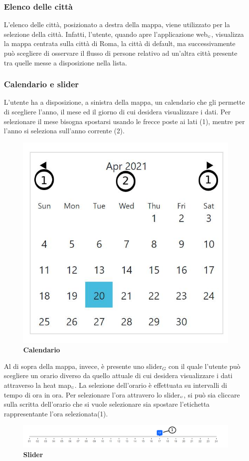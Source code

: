 \subsubsection{Elenco delle città} \label{UtilizzoDiGDPGatheringDetecionPlatformContenutoCentralePaginaInizialeHomeMenùATendina}
L'elenco delle città, posizionato a destra della mappa, viene utilizzato per la selezione della città. Infatti, l'utente, quando apre l'applicazione web$_{\scaleto{G}{3pt}}$, visualizza la mappa centrata sulla città di Roma, la città di default, ma successivamente può scegliere di osservare il flusso di persone relativo ad un'altra città presente tra quelle messe a disposizione nella lista.


\subsubsection{Calendario e slider}\label{UtilizzoDiGDPGatheringDetecionPlatformContenutoCentralePaginaInizialeHomeCalendarioESlider}
L'utente ha a disposizione, a sinistra della mappa, un calendario che gli permette di scegliere l'anno, il mese ed il giorno di cui desidera visualizzare i dati. Per selezionare il mese bisogna spostarsi usando le frecce poste ai lati (1), mentre per l'anno si seleziona sull'anno corrente (2).
\begin{center}
	\begin{figure}[H]
		\centering\includegraphics[width=0.3\linewidth]{../immagini/manualeUtente/Calendario.jpg}
		\caption{\textbf{Calendario}}
	\end{figure}
\end{center}
Al di sopra della mappa, invece, è presente uno slider$_G$ con il quale l'utente può scegliere un orario diverso da quello attuale di cui desidera visualizzare i dati attraverso la heat map$_{\scaleto{G}{3pt}}$. La selezione dell'orario è effettuata su intervalli di tempo di ora in ora. Per selezionare l'ora attravero lo slider$_{\scaleto{G}{3pt}}$, si può sia cliccare sulla scritta dell'orario che si vuole selezionare sia spostare l'etichetta rappresentante l'ora selezionata(1).
\begin{center}
	\begin{figure}[H]
		\centering\includegraphics[width=1\linewidth]{../immagini/manualeUtente/Slider.png}
		\caption{\textbf{Slider}}
	\end{figure}
\end{center}

